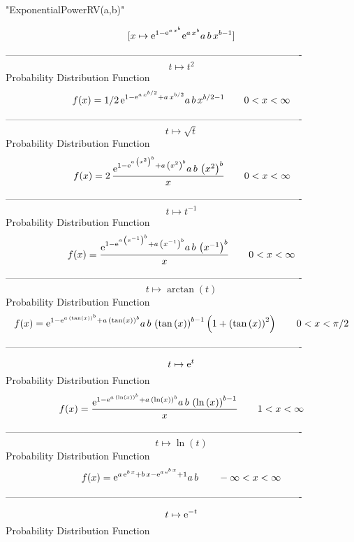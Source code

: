 \documentclass[12pt]{article}
\begin{document}
 
                          "ExponentialPowerRV(a,b)"

$$[x\mapsto {{\rm e}^{1-{{\rm e}^{a\,{x}^{b}}}}}{{\rm e}^{a\,{x}^{b}}}a
\,b\,{x}^{b-1}]
$$-------------------------------------------------------------------------------------------  \\$$t\mapsto {t}^{2}
$$Probability Distribution Function 
$$  f(x)=1/2\,{{\rm e}^{1-{{\rm e}^{a\,{x}^{b/2}}}+a\,{x}^{b/2}}}a\,b\,{x}^{b/2
-1}
 \qquad0
 < x < \infty 
$$-------------------------------------------------------------------------------------------  \\$$t\mapsto \sqrt {t}
$$Probability Distribution Function 
$$  f(x)=2\,{\frac {{{\rm e}^{1-{{\rm e}^{a\, \left( {x}^{2} \right) ^{b}}}+a\,
 \left( {x}^{2} \right) ^{b}}}a\,b\, \left( {x}^{2} \right) ^{b}}{x}}
 \qquad0
 < x < \infty 
$$-------------------------------------------------------------------------------------------  \\$$t\mapsto {t}^{-1}
$$Probability Distribution Function 
$$  f(x)={\frac {{{\rm e}^{1-{{\rm e}^{a\, \left( {x}^{-1} \right) ^{b}}}+a\,
 \left( {x}^{-1} \right) ^{b}}}a\,b\, \left( {x}^{-1} \right) ^{b}}{x}
}
 \qquad0
 < x < \infty 
$$-------------------------------------------------------------------------------------------  \\$$t\mapsto \arctan \left( t \right) 
$$Probability Distribution Function 
$$  f(x)={{\rm e}^{1-{{\rm e}^{a\, \left( \tan \left( x \right)  \right) ^{b}}}
+a\, \left( \tan \left( x \right)  \right) ^{b}}}a\,b\, \left( \tan
 \left( x \right)  \right) ^{b-1} \left( 1+ \left( \tan \left( x
 \right)  \right) ^{2} \right) 
 \qquad0
 < x < \pi/2
$$-------------------------------------------------------------------------------------------  \\$$t\mapsto {{\rm e}^{t}}
$$Probability Distribution Function 
$$  f(x)={\frac {{{\rm e}^{1-{{\rm e}^{a\, \left( \ln  \left( x \right) 
 \right) ^{b}}}+a\, \left( \ln  \left( x \right)  \right) ^{b}}}a\,b\,
 \left( \ln  \left( x \right)  \right) ^{b-1}}{x}}
 \qquad1
 < x < \infty 
$$-------------------------------------------------------------------------------------------  \\$$t\mapsto \ln  \left( t \right) 
$$Probability Distribution Function 
$$  f(x)={{\rm e}^{a\,{{\rm e}^{b\,x}}+b\,x-{{\rm e}^{a\,{{\rm e}^{b\,x}}}}+1}}
a\,b
 \qquad-\infty 
 < x < \infty 
$$-------------------------------------------------------------------------------------------  \\$$t\mapsto {{\rm e}^{-t}}
$$Probability Distribution Function 
\end{document}
